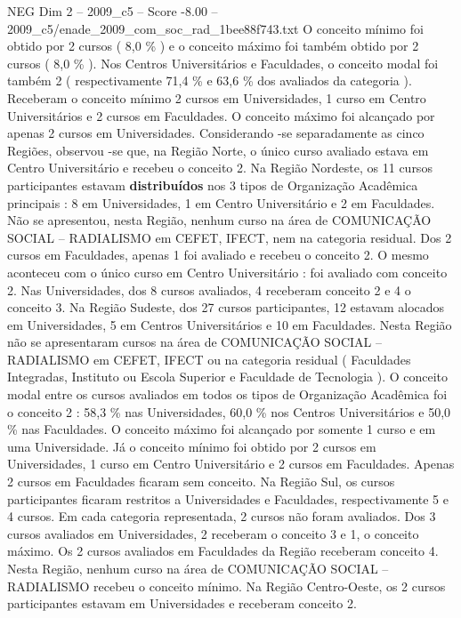 \begin{textsample}{NEG Dim 2 – 2009\_c5 – Score -8.00 – 2009\_c5/enade\_2009\_com\_soc\_rad\_1bee88f743.txt}
O conceito mínimo foi obtido por 2 cursos ( 8,0 \% ) e o conceito máximo foi também obtido por 2 cursos ( 8,0 \% ).
Nos Centros Universitários e Faculdades, o conceito modal foi também 2 ( respectivamente 71,4 \% e 63,6 \% dos avaliados da categoria ).
Receberam o conceito mínimo 2 cursos em Universidades, 1 curso em Centro Universitários e 2 cursos em Faculdades.
O conceito máximo foi alcançado por apenas 2 cursos em Universidades.
Considerando -se separadamente as cinco Regiões, observou -se que, na Região Norte, o único curso avaliado estava em Centro Universitário e recebeu o conceito 2.
Na Região Nordeste, os 11 cursos participantes estavam \textbf{distribuídos} nos 3 tipos de Organização Acadêmica principais : 8 em Universidades, 1 em Centro Universitário e 2 em Faculdades.
Não se apresentou, nesta Região, nenhum curso na área de COMUNICAÇÃO SOCIAL – RADIALISMO em CEFET, IFECT, nem na categoria residual.
Dos 2 cursos em Faculdades, apenas 1 foi avaliado e recebeu o conceito 2.
O mesmo aconteceu com o único curso em Centro Universitário : foi avaliado com conceito 2.
Nas Universidades, dos 8 cursos avaliados, 4 receberam conceito 2 e 4 o conceito 3.
Na Região Sudeste, dos 27 cursos participantes, 12 estavam alocados em Universidades, 5 em Centros Universitários e 10 em Faculdades.
Nesta Região não se apresentaram cursos na área de COMUNICAÇÃO SOCIAL – RADIALISMO em CEFET, IFECT ou na categoria residual ( Faculdades Integradas, Instituto ou Escola Superior e Faculdade de Tecnologia ).
O conceito modal entre os cursos avaliados em todos os tipos de Organização Acadêmica foi o conceito 2 : 58,3 \% nas Universidades, 60,0 \% nos Centros Universitários e 50,0 \% nas Faculdades.
O conceito máximo foi alcançado por somente 1 curso e em uma Universidade.
Já o conceito mínimo foi obtido por 2 cursos em Universidades, 1 curso em Centro Universitário e 2 cursos em Faculdades.
Apenas 2 cursos em Faculdades ficaram sem conceito.
Na Região Sul, os cursos participantes ficaram restritos a Universidades e Faculdades, respectivamente 5 e 4 cursos.
Em cada categoria representada, 2 cursos não foram avaliados.
Dos 3 cursos avaliados em Universidades, 2 receberam o conceito 3 e 1, o conceito máximo.
Os 2 cursos avaliados em Faculdades da Região receberam conceito 4.
Nesta Região, nenhum curso na área de COMUNICAÇÃO SOCIAL – RADIALISMO recebeu o conceito mínimo.
Na Região Centro-Oeste, os 2 cursos participantes estavam em Universidades e receberam conceito 2.

\end{textsample}
